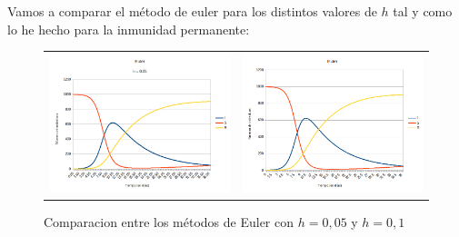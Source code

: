 \documentclass[11pt,a4paper]{report}
\begin{document}
Vamos a comparar el método de euler para los distintos valores de $h$ tal y como lo he hecho para la inmunidad permanente:

\begin{figure}[H]
\begin{tabular}{ll}
\includegraphics[scale=0.25]{img/sin_inmunidad/euler-0-05.png}
&
\includegraphics[scale=0.25]{img/sin_inmunidad/euler.png}
\end{tabular}
\caption{Comparacion entre los métodos de Euler con $h = 0,05$ y $h = 0,1$}
\end{figure}
\end{document}
